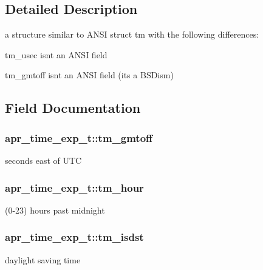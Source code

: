 \subsection{Detailed Description}
a structure similar to A\+N\+SI struct tm with the following differences\+:
\begin{DoxyItemize}
\item tm\+\_\+usec isn\textquotesingle{}t an A\+N\+SI field
\item tm\+\_\+gmtoff isn\textquotesingle{}t an A\+N\+SI field (it\textquotesingle{}s a B\+S\+Dism) 
\end{DoxyItemize}

\subsection{Field Documentation}
\subsubsection[{\texorpdfstring{tm\+\_\+gmtoff}{tm_gmtoff}}]{ apr\+\_\+time\+\_\+exp\+\_\+t\+::tm\+\_\+gmtoff}\hypertarget{structapr__time__exp__t_a1102ca16ed70b1c707473431eed58d7b}{}\label{structapr__time__exp__t_a1102ca16ed70b1c707473431eed58d7b}
seconds east of U\+TC 
\subsubsection[{\texorpdfstring{tm\+\_\+hour}{tm_hour}}]{ apr\+\_\+time\+\_\+exp\+\_\+t\+::tm\+\_\+hour}\hypertarget{structapr__time__exp__t_a2dbab1d10ed6234c8e9e714e13b7911c}{}\label{structapr__time__exp__t_a2dbab1d10ed6234c8e9e714e13b7911c}
(0-\/23) hours past midnight 
\subsubsection[{\texorpdfstring{tm\+\_\+isdst}{tm_isdst}}]{ apr\+\_\+time\+\_\+exp\+\_\+t\+::tm\+\_\+isdst}\hypertarget{structapr__time__exp__t_a4d899f1fb9fde3c6b6893941fa81b1c8}{}\label{structapr__time__exp__t_a4d899f1fb9fde3c6b6893941fa81b1c8}
daylight saving time 
